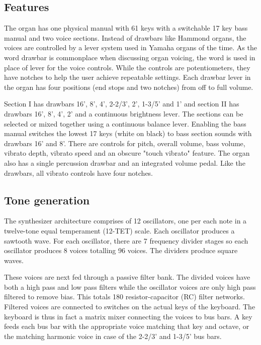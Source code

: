 \documentclass[11pt,a4paper]{article}
\begin{document}
\subsection{Features}

The organ has one physical manual with 61 keys with a switchable 17 key bass manual and two voice sections. Instead of drawbars like Hammond organs, the voices are controlled by a lever system used in Yamaha organs of the time. As the word drawbar is commonplace when discussing organ voicing, the word is used in place of lever for the voice controls. While the controls are potentiometers, they have notches to help the user achieve repeatable settings. Each drawbar lever in the organ has four positions (end stops and two notches) from off to full volume. 

Section I has drawbars 16', 8', 4', 2-2/3', 2', 1-3/5' and 1' and section II has drawbars 16', 8', 4', 2' and a continuous brightness lever. The sections can be selected or mixed together using a continuous balance lever. Enabling the bass manual switches the lowest 17 keys (white on black) to bass section sounds with drawbars 16' and 8'. There are controls for pitch, overall volume, bass volume, vibrato depth, vibrato speed and an obscure "touch vibrato" feature. The organ also has a single percussion drawbar and an integrated volume pedal. Like the drawbars, all vibrato controls have four notches.

\subsection{Tone generation}

The synthesizer architecture comprises of 12 oscillators, one per each note in a twelve-tone equal temperament (12-TET) scale. Each oscillator produces a sawtooth wave. For each oscillator, there are 7 frequency divider stages so each oscillator produces 8 voices totalling 96 voices. The dividers produce square waves. 

These voices are next fed through a passive filter bank. The divided voices have both a high pass and low pass filters while the oscillator voices are only high pass filtered to remove bias. This totals 180 resistor-capacitor (RC) filter networks. Filtered voices are connected to switches on the actual keys of the keyboard. The keyboard is thus in fact a matrix mixer connecting the voices to bus bars. A key feeds each bus bar with the appropriate voice matching that key and octave, or the matching harmonic voice in case of the 2-2/3' and 1-3/5' bus bars. 
\end{document}
